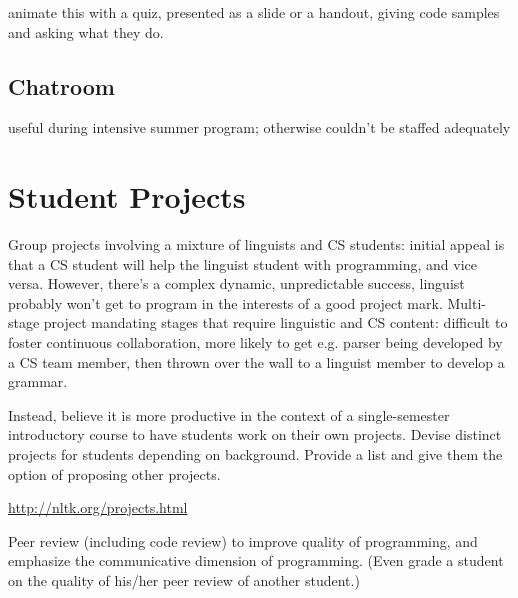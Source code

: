 \documentclass[11pt]{article}
\begin{document}
animate this with a quiz, presented as a slide or a handout, giving code samples and asking what they do.

\subsection{Chatroom}

useful during intensive summer program; otherwise couldn't be staffed adequately

\section{Student Projects}
\label{sec:student-projects}

Group projects involving a mixture of linguists and CS students:
initial appeal is that a CS student will help the linguist student with programming,
and vice versa.  However, there's a
complex dynamic, unpredictable success, linguist probably won't get to program
in the interests of a good project mark.
Multi-stage project mandating stages that require linguistic and CS content: difficult
to foster continuous collaboration, more likely to get e.g. parser being developed by
a CS team member, then thrown over the wall to a linguist member to develop a grammar.

Instead, believe it is more productive in the context of a single-semester introductory
course to have students work on their own projects.  Devise distinct projects for
students depending on background.  Provide a list and give them the option of proposing
other projects.

\url{http://nltk.org/projects.html}

Peer review (including code review) to improve quality of programming, and
emphasize the communicative dimension of programming.
(Even grade a student on the quality of his/her peer review of another student.)






\end{document}
